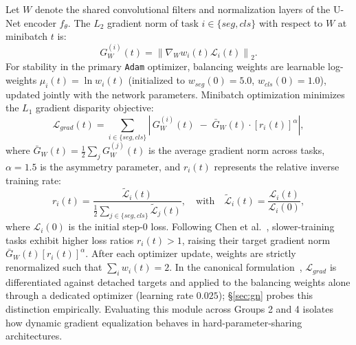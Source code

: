 \documentclass[runningheads]{llncs}
\begin{document}
Let $W$ denote the shared convolutional filters and normalization layers of the U-Net encoder $f_\theta$. The $L_2$ gradient norm of task $i \in \{seg, cls\}$ with respect to $W$ at minibatch $t$ is:
\begin{equation}
    G_W^{(i)}(t) = \left\| \nabla_{W} w_i(t) \mathcal{L}_i(t) \right\|_2.
\end{equation}
For stability in the primary \texttt{Adam} optimizer, balancing weights are learnable log-weights $\mu_i(t) = \ln w_i(t)$ (initialized to $w_{seg}(0) = 5.0$, $w_{cls}(0) = 1.0$), updated jointly with the network parameters. Minibatch optimization minimizes the $L_1$ gradient disparity objective:
\begin{equation}
    \mathcal{L}_{grad}(t) = \sum_{i \in \{seg, cls\}} \left| \, G_W^{(i)}(t) \;-\; \bar{G}_W(t) \cdot [r_i(t)]^{\alpha} \right|,
\end{equation}
where $\bar{G}_W(t) = \frac{1}{2}\sum_j G_W^{(j)}(t)$ is the average gradient norm across tasks, $\alpha = 1.5$ is the asymmetry parameter, and $r_i(t)$ represents the relative inverse training rate:
\begin{equation}
    r_i(t) = \frac{\tilde{\mathcal{L}}_i(t)}{\frac{1}{2}\sum_{j \in \{seg, cls\}} \tilde{\mathcal{L}}_j(t)}, \quad \text{with} \quad \tilde{\mathcal{L}}_i(t) = \frac{\mathcal{L}_i(t)}{\mathcal{L}_i(0)},
\end{equation}
where $\mathcal{L}_i(0)$ is the initial step-0 loss. Following Chen et al.~\cite{chen2018gradnorm}, slower-training tasks exhibit higher loss ratios $r_i(t) > 1$, raising their target gradient norm $\bar{G}_W(t) [r_i(t)]^\alpha$. After each optimizer update, weights are strictly renormalized such that $\sum_i w_i(t) = 2$. In the canonical formulation~\cite{chen2018gradnorm}, $\mathcal{L}_{grad}$ is differentiated against detached targets and applied to the balancing weights alone through a dedicated optimizer (learning rate $0.025$); \S\ref{sec:gn} probes this distinction empirically. Evaluating this module across Groups 2 and 4 isolates how dynamic gradient equalization behaves in hard-parameter-sharing architectures.
\end{document}
